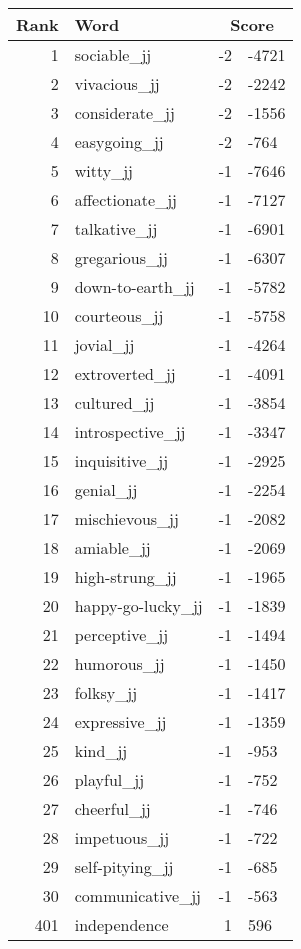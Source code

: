 \begin{longtable}[!htbp]{| rlr@{.}l |}
    \hline
    \textbf{Rank} & \textbf{Word} & \multicolumn{2}{c|}{\textbf{Score}} \\
    \hline
    \endhead
    1 & sociable\_jj & -2 & -4721 \\
    2 & vivacious\_jj & -2 & -2242 \\
    3 & considerate\_jj & -2 & -1556 \\
    4 & easygoing\_jj & -2 & -764 \\
    5 & witty\_jj & -1 & -7646 \\
    6 & affectionate\_jj & -1 & -7127 \\
    7 & talkative\_jj & -1 & -6901 \\
    8 & gregarious\_jj & -1 & -6307 \\
    9 & down-to-earth\_jj & -1 & -5782 \\
    10 & courteous\_jj & -1 & -5758 \\
    11 & jovial\_jj & -1 & -4264 \\
    12 & extroverted\_jj & -1 & -4091 \\
    13 & cultured\_jj & -1 & -3854 \\
    14 & introspective\_jj & -1 & -3347 \\
    15 & inquisitive\_jj & -1 & -2925 \\
    16 & genial\_jj & -1 & -2254 \\
    17 & mischievous\_jj & -1 & -2082 \\
    18 & amiable\_jj & -1 & -2069 \\
    19 & high-strung\_jj & -1 & -1965 \\
    20 & happy-go-lucky\_jj & -1 & -1839 \\
    21 & perceptive\_jj & -1 & -1494 \\
    22 & humorous\_jj & -1 & -1450 \\
    23 & folksy\_jj & -1 & -1417 \\
    24 & expressive\_jj & -1 & -1359 \\
    25 & kind\_jj & -1 & -953 \\
    26 & playful\_jj & -1 & -752 \\
    27 & cheerful\_jj & -1 & -746 \\
    28 & impetuous\_jj & -1 & -722 \\
    29 & self-pitying\_jj & -1 & -685 \\
    30 & communicative\_jj & -1 & -563 \\
    401 & independence & 1 & 596 \\

\end{longtable}
